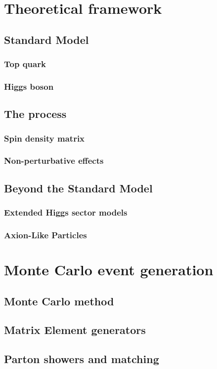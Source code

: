 \chapter{Theoretical framework}
\label{ch:theory}

\section{Standard Model}

\subsection{Top quark}

\subsection{Higgs boson}

\section{The \pptt process}
\label{sec:theory:ttbar}

\subsection{Spin density matrix}

\subsection{Non-perturbative effects}

\section{Beyond the Standard Model}

\subsection{Extended Higgs sector models}
\label{sec:theory:hext}

\subsection{Axion-Like Particles}

\chapter{Monte Carlo event generation}

\section{Monte Carlo method}

\section{Matrix Element generators}

\section{Parton showers and matching}